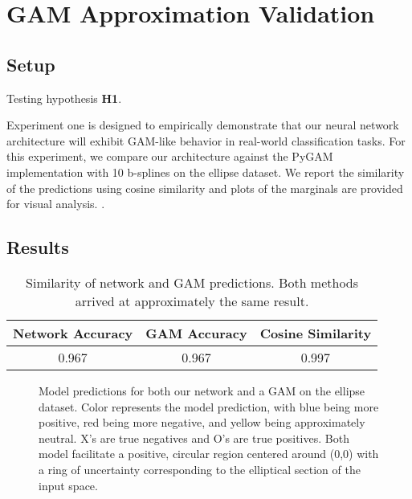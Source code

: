 
\section{GAM Approximation Validation}

\subsection{Setup}

Testing hypothesis \textbf{H1}. \textit{}

Experiment one is designed to empirically demonstrate that our neural network architecture will exhibit GAM-like behavior in real-world classification tasks. For this experiment, we compare our architecture against the PyGAM implementation with 10 b-splines on the ellipse dataset. We report the similarity of the predictions using cosine similarity and plots of the marginals are provided for visual analysis.  \citep{Domingos2012ALearning}. 


\subsection{Results}

\begin{table}[h]
    \centering
    \begin{tabular}{ccc}
        \toprule
        Network Accuracy & GAM Accuracy & Cosine Similarity \\
        \midrule
        0.967 &  0.967 &  0.997 \\
        \bottomrule
    \end{tabular}
\caption{Similarity of network and GAM predictions. Both methods arrived at approximately the same result.}
\end{table}

\begin{figure}
\centering
\begin{subfigure}{.5\textwidth}
  \centering
  
\end{subfigure}%
\begin{subfigure}{.5\textwidth}
  \centering
  
\end{subfigure}
\caption{Model predictions for both our network and a GAM on the ellipse dataset. Color represents the model prediction, with blue being more positive, red being more negative, and yellow being approximately neutral. X's are true negatives and O's are true positives. Both model facilitate a positive, circular region centered around (0,0) with a ring of uncertainty corresponding to the elliptical section of the input space.}
\label{fig:ellipse}
\end{figure}

